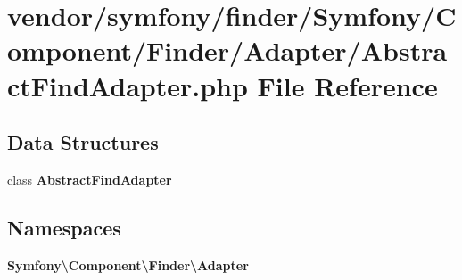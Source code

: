 \section{vendor/symfony/finder/\+Symfony/\+Component/\+Finder/\+Adapter/\+Abstract\+Find\+Adapter.php File Reference}
\label{_abstract_find_adapter_8php}
\subsection*{Data Structures}
\begin{DoxyCompactItemize}
\item 
class {\bf Abstract\+Find\+Adapter}
\end{DoxyCompactItemize}
\subsection*{Namespaces}
\begin{DoxyCompactItemize}
\item 
 {\bf Symfony\textbackslash{}\+Component\textbackslash{}\+Finder\textbackslash{}\+Adapter}
\end{DoxyCompactItemize}
